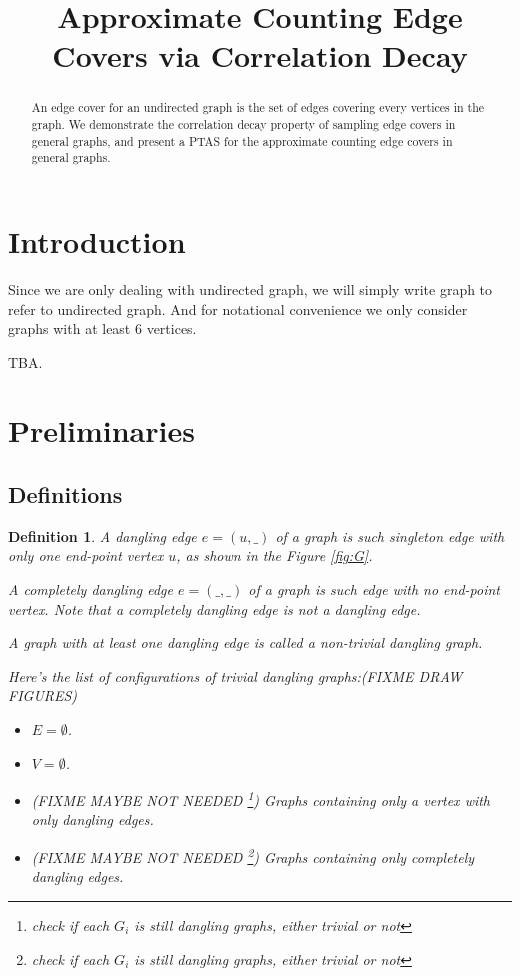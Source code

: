 \documentclass[a4paper]{article}
\title{Approximate Counting Edge Covers via Correlation Decay}
\newtheorem{Def}[Thm]{Definition}
\begin{document}
\maketitle
\begin{abstract}
	An edge cover for an undirected graph is the set of edges covering every vertices in the graph.
	We demonstrate the correlation decay property of sampling edge covers in general graphs, and present a PTAS for the approximate counting edge covers in general graphs.
\end{abstract}
\section{Introduction}
Since we are only dealing with undirected graph, we will simply write graph to refer to undirected graph.
And for notational convenience we only consider graphs with at least $6$ vertices.

TBA.
\section{Preliminaries}
\subsection{Definitions}
\begin{Def}
	A dangling edge $e=(u,\_)$ of a graph is such singleton edge with only one end-point vertex $u$, as shown in the Figure \ref{fig:G}.

	A completely dangling edge $e=(\_, \_)$ of a graph is such edge with no end-point vertex. Note that a completely dangling edge is not a dangling edge.

	A graph with at least one dangling edge is called a non-trivial dangling graph.
	
	Here's the list of configurations of trivial dangling graphs:(FIXME DRAW FIGURES) 
	\begin{itemize}
		\item  $E=\emptyset$.
		\item $V=\emptyset$.
		\item (FIXME MAYBE NOT NEEDED \footnote{check if each $G_i$ is still dangling graphs, either trivial or not}) Graphs containing only a vertex with only dangling edges.
		\item (FIXME MAYBE NOT NEEDED \footnote{check if each $G_i$ is still dangling graphs, either trivial or not}) Graphs containing only completely dangling edges.
	\end{itemize}
\end{Def}
\end{document}
